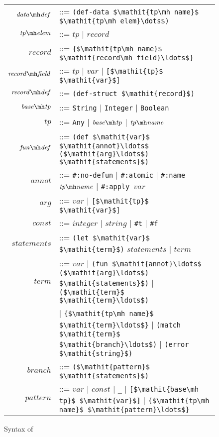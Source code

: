 \begin{figure}
\centering
\begin{tabular}{rl}
$\mathit{data\mh def}$
& ::= \lstinline!(def-data $\mathit{tp\mh name}$ $\mathit{tp\mh elem}\dots$)!\\

$\mathit{tp\mh elem}$
& ::= $\mathit{tp}$ | $\mathit{record}$\\

$\mathit{record}$
& ::= \lstinline!{$\mathit{tp\mh name}$ $\mathit{record\mh field}\ldots$}!\\

$\mathit{record\mh field}$
& ::= $\mathit{tp}$
  | $\mathit{var}$
  | \lstinline![$\mathit{tp}$ $\mathit{var}$]!\\

$\mathit{record\mh def}$
& ::= \lstinline!(def-struct $\mathit{record}$)!\\

$\mathit{base\mh tp}$
& ::= \lstinline!String! | \lstinline!Integer! | \lstinline!Boolean!\\

$\mathit{tp}$
& ::= \lstinline!Any! | $\mathit{base\mh tp}$ | $\mathit{tp\mh name}$\\

$\mathit{fun\mh def}$
& ::= \lstinline!(def $\mathit{var}$ $\mathit{annot}\ldots$ ($\mathit{arg}\ldots$) $\mathit{statements}$)!\\

$\mathit{annot}$
& ::= \lstinline!#:no-defun!
    | \lstinline!#:atomic!
    | \lstinline!#:name !$\mathit{tp\mh name}$
    | \lstinline!#:apply !$\mathit{var}$\\

$\mathit{arg}$
& ::= $\mathit{var}$ | \lstinline![$\mathit{tp}$ $\mathit{var}$]!\\

$\mathit{const}$
& ::= $\mathit{integer}$ | $\mathit{string}$ | \lstinline!#t! | \lstinline!#f!\\

$\mathit{statements}$
& ::= \lstinline!(let $\mathit{var}$ $\mathit{term}$)! $\mathit{statements}$
    | $\mathit{term}$\\

$\mathit{term}$
& ::= $\mathit{var}$ 
    | \lstinline!(fun $\mathit{annot}\ldots$ ($\mathit{arg}\ldots$) $\mathit{statements}$)!
    | \lstinline!($\mathit{term}$ $\mathit{term}\ldots$)!\\
&   | \lstinline!{$\mathit{tp\mh name}$ $\mathit{term}\ldots$}!
    | \lstinline!(match $\mathit{term}$ $\mathit{branch}\ldots$)!
    | \lstinline!(error $\mathit{string}$)!\\

$\mathit{branch}$
& ::= \lstinline!($\mathit{pattern}$ $\mathit{statements}$)!\\

$\mathit{pattern}$
& ::= $\mathit{var}$ | $\mathit{const}$ | \lstinline!_! | \lstinline![$\mathit{base\mh tp}$ $\mathit{var}$]! | \lstinline!{$\mathit{tp\mh name}$ $\mathit{pattern}\ldots$}!\\
\end{tabular}
\caption{Syntax of \IDL{}}
\label{fig:idl-syntax}
\end{figure}